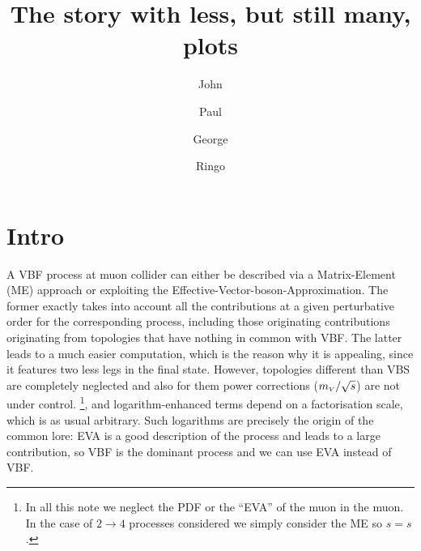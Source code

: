 \documentclass[a4paper,11pt]{article}
\title{The story with less, but still many, plots}
\author[a]{John}
\author[a]{Paul}
\author[a]{George}
\author[a]{Ringo}
\affiliation[a]{Abbey Rd.~London, Regno Unito
}
\begin{document}
\maketitle
\flushbottom


\section{Intro}

A VBF process at muon collider can either be described via a Matrix-Element (ME) approach or exploiting the Effective-Vector-boson-Approximation. 
The former exactly takes into account all the contributions at a given perturbative order for the corresponding process, including those originating  contributions originating from  topologies that have nothing in common with VBF.  The latter leads to a much easier computation, which is the reason why it is appealing, since it features two less legs in the final state. However, topologies different than VBS are completely neglected and also for them 
power corrections ($m_{\scriptscriptstyle V}/\sqrt{s}$) are not under control. \footnote{In all this note we neglect the PDF or the ``EVA'' of the muon in the muon. In the case of $2\to 4$ processes considered we simply consider the ME so $\hat s= s$.}, and logarithm-enhanced terms depend on a factorisation scale, which is as usual arbitrary. Such logarithms are precisely the origin of the common lore: EVA is a good description of the process and leads to a large contribution, so VBF is the dominant process and we can use EVA instead of VBF.
\end{document}
